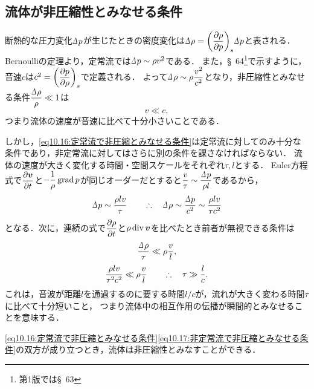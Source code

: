 \subsection*{流体が非圧縮性とみなせる条件}
断熱的な圧力変化$\D p$が生じたときの密度変化は$\D\rho = \dPDV{\rho}{p}{s} \D p$と表される．
Bernoulliの定理より，定常流では$\D p \sim \rho v^2$である．
また，\S~64\footnote{第1版では\S~63}で示すように，音速$c$は$c^2 = \dPDV{p}{\rho}{s}$で定義される．
よって$\D\rho \sim \rho \dfrac{v^2}{c^2}$となり，非圧縮性とみなせる条件$\dfrac{\D\rho}{\rho} \ll 1$は
\begin{equation}\label{eq10.16:定常流で非圧縮とみなせる条件}
    v \ll c,
\end{equation}
つまり流体の速度が音速に比べて十分小さいことである．

しかし，\eqref{eq10.16:定常流で非圧縮とみなせる条件}は定常流に対してのみ十分な条件であり，非定常流に対してはさらに別の条件を課さなければならない．
流体の速度が大きく変化する時間・空間スケールをそれぞれ$\tau,l$とする．
Euler方程式で$\dpdv{\v}{t}$と$-\dfrac{1}{\rho}\operatorname{grad} p$が同じオーダーだとすると$\dfrac{v}{\tau} \sim \dfrac{\D p}{\rho l}$であるから，
\[
    \D p \sim \frac{\rho l v}{\tau}
    \qquad\yueni \D\rho \sim \frac{\D p}{c^2} \sim \frac{\rho l v}{\tau c^2}
\]
となる．次に，連続の式で$\dpdv{\rho}{t}$と$\rho\operatorname{div}\vb*{v}$を比べたとき前者が無視できる条件は
\[
    \frac{\D\rho}{\tau} \ll \rho\frac{v}{l},
\]
\begin{equation}\label{eq10.17:非定常流で非圧縮とみなせる条件}
    \frac{\rho l v}{\tau^2 c^2} \ll \rho\frac{v}{l}
    \qquad\therefore\quad \tau \gg \frac{l}{c}.
\end{equation}
これは，音波が距離$l$を通過するのに要する時間$l/c$が，流れが大きく変わる時間$\tau$に比べて十分短いこと，
つまり流体中の相互作用の伝播が瞬間的とみなせることを意味する．

\eqref{eq10.16:定常流で非圧縮とみなせる条件}\eqref{eq10.17:非定常流で非圧縮とみなせる条件}の双方が成り立つとき，流体は非圧縮性とみなすことができる．



\BackToTheToc